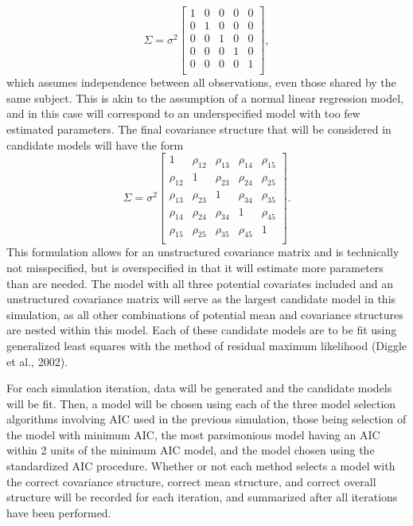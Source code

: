 				\begin{equation*}
			\Sigma = \sigma^2
			\begin{bmatrix}
				1 & 0 & 0 & 0 & 0 \\
				0 & 1 & 0 & 0 & 0 \\
				0 & 0 & 1 & 0 & 0 \\
				0 & 0 & 0 & 1 & 0 \\
				0 & 0 & 0 & 0 & 1 \\
			\end{bmatrix}
			,
		\end{equation*}
		which assumes independence between all observations, even those shared by the same subject. This is akin to the assumption of a normal linear regression model, and in this case will correspond to
		an underspecified model with too few estimated parameters. The final covariance structure that will be considered in candidate models will have the form
		\begin{equation*}
			\Sigma = \sigma^2
			\begin{bmatrix}
				1 & \rho_{12} & \rho_{13} & \rho_{14} & \rho_{15} \\
				\rho_{12} & 1 & \rho_{23} & \rho_{24} & \rho_{25} \\
				\rho_{13} & \rho_{23} & 1 & \rho_{34} & \rho_{35} \\
				\rho_{14} & \rho_{24} & \rho_{34} & 1 & \rho_{45} \\
				\rho_{15} & \rho_{25} & \rho_{35} & \rho_{45} & 1 \\
			\end{bmatrix}
			.
		\end{equation*}
		This formulation allows for an unstructured covariance matrix and is technically not misspecified, but is overspecified in that it will estimate more parameters than are needed. The model
		with all three potential covariates included and an unstructured covariance matrix will serve as the largest candidate model in this simulation, as all other combinations of potential
		mean and covariance structures are nested within this model. Each of these candidate models are to be fit using generalized least squares with the method of residual maximum likelihood (Diggle et al., 2002).

		For each simulation iteration, data will be generated and the candidate models will be fit. Then, a model will be chosen using each of the three model selection algorithms involving
		AIC used in the previous simulation, those being selection of the model with minimum AIC, the most parsimonious model having an AIC within 2 units of the minimum AIC model, and the model chosen using the
		standardized AIC procedure. Whether or not each method selects a model with the correct covariance structure, correct mean structure, and correct overall structure will be recorded for each iteration, and
		summarized after all iterations have been performed.

